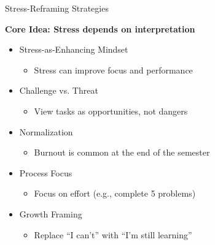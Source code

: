 \documentclass[dvipsnames]{beamer}
\begin{document}
\begin{frame}{Stress-Reframing Strategies}

\textbf{Core Idea: Stress depends on interpretation}



\begin{itemize}
    \item Stress-as-Enhancing Mindset
    \begin{itemize}
        \item Stress can improve focus and performance
    \end{itemize}
    
    
    
    \item Challenge vs. Threat
    \begin{itemize}
        \item View tasks as opportunities, not dangers
    \end{itemize}
    
    
    
    \item Normalization
    \begin{itemize}
        \item Burnout is common at the end of the semester
    \end{itemize}
    
    
    
    \item Process Focus
    \begin{itemize}
        \item Focus on effort (e.g., complete 5 problems)
    \end{itemize}
    
    
    
    \item Growth Framing
    \begin{itemize}
        \item Replace “I can’t” with “I’m still learning”
    \end{itemize}
\end{itemize}

\end{frame}
\end{document}
